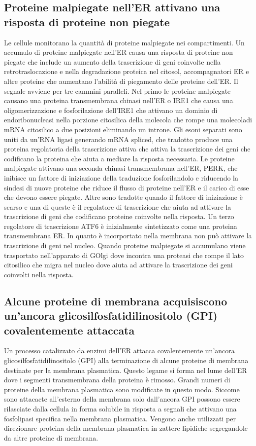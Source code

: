 \subsection{Proteine malpiegate nell'ER attivano una risposta di proteine non piegate}
Le cellule monitorano la quantit\`a di proteine malpiegate nei compartimenti. Un accumulo di proteine malpiegate nell'ER causa una risposta di proteine non piegate che include un 
aumento della trascrizione di geni coinvolte nella retrotraslocazione e nella degradazione proteica nel citosol, accompagnatori ER e altre proteine che aumentano l'abilit\`a di 
piegamento delle proteine dell'ER. Il segnale avviene per tre cammini paralleli. Nel primo le proteine malpiegate causano una proteina transmembrana chinasi nell'ER o IRE1 che 
causa una oligomerizzazione e fosforilazione dell'IRE1 che attivano un dominio di endoribonucleasi nella porzione citosilica della molecola che rompe una molecoladi mRNA citosilico
a due posizioni eliminando un introne. Gli esoni separati sono uniti da un'RNA ligasi generando mRNA spliced, che tradotto produce una proteina regolatoria della trascrizione attiva
che attiva la trascrizione dei geni che codificano la proteina che aiuta a mediare la risposta necessaria. Le proteine malpiegate attivano una seconda chinasi transmembrana nell'ER, 
PERK, che inibisce un fattore di iniziazione della traduzione fosforilandolo e riducendo la sindesi di nuove proteine che riduce il flusso di proteine nell'ER e il carico di esse che
devono essere piegate. Altre sono tradotte quando il fattore di iniziazione \`e scarso e una di queste \`e il regolatore di trascrizione che aiuta ad attivare la trascrizione di geni
che codificano proteine coinvolte nella risposta. Un terzo regolatore di trascrizione ATF6  \`e inizialmente sintetizzato come una proteina transmembrana ER. In quanto \`e incorportato
nella membrana non pu\`o attivare la trascrizione di geni nel nucleo. Quando proteine malpiegate si accumulano viene trasportato nell'apparato di GOlgi dove incontra una proteasi che
rompe il lato citosilico che migra nel nucleo dove aiuta ad attivare la trascrizione dei geni coinvolti nella risposta. 
\subsection{Alcune proteine di membrana acquisiscono un'ancora glicosilfosfatidilinositolo (GPI) covalentemente attaccata}
Un processo catalizzato da enzimi dell'ER attacca covalentemente un'ancora glicosilfosfatidilinositolo (GPI) alla terminazione  di alcune proteine di membrana destinate per la 
membrana plasmatica. Questo legame si forma nel lume dell'ER dove i segmenti transmembrana della proteina \`e rimosso. Grandi numeri di proteine della membrana plasmatica sono 
modificate in questo modo. Siccome sono attacacte all'esterno della membrana solo dall'ancora GPI possono essere rilasciate dalla cellula in forma solubile in risposta a segnali che
attivano una fosfolipasi specifica nella membrana plasmatica. Vengono anche utilizzati per direzionare proteina della membrana plasmatica in zattere lipidiche segregandole da
altre proteine di membrana.
